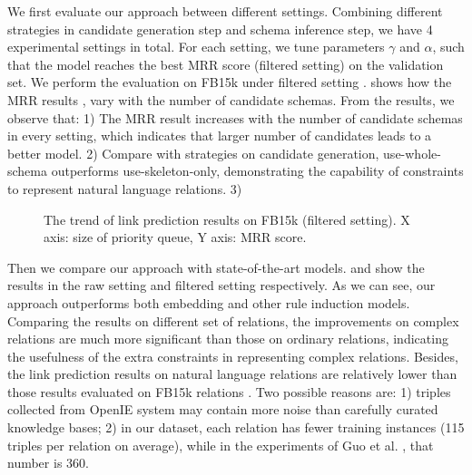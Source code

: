 We first evaluate our approach between different settings.
Combining different strategies in candidate generation step and 
schema inference step, we have 4 experimental settings in total.
For each setting, we tune parameters $\gamma$ and $\alpha$, such that
the model reaches the best MRR score (filtered setting) on the validation set.
We perform the evaluation on FB15k under filtered setting .
 shows how the MRR results 
, vary with the number of candidate schemas.
From the results, we observe that:
1) The MRR result increases with the number of candidate schemas in 
every setting, which indicates that larger number of candidates 
leads to a better model.
2) Compare with strategies on candidate generation, use-whole-schema 
outperforms use-skeleton-only, demonstrating the capability of constraints
to represent natural language relations.
3) 

\begin{figure}[th]
\centering
\caption{
	The trend of link prediction results on FB15k (filtered setting).
	X axis: size of priority queue,
	Y axis: MRR score. 
}
\label{fig:trend-with-budget}
\end{figure}

Then we compare our approach with state-of-the-art models.
 and  
show the results in
the raw setting and filtered setting respectively.
As we can see, our approach outperforms both embedding and 
other rule induction models.
Comparing the results on different set of relations,
the improvements on complex relations are much more significant than those
on ordinary relations, indicating the usefulness of the extra constraints 
in representing complex relations.
Besides, the link prediction results on natural language relations 
are relatively lower than
those results evaluated on FB15k relations \cite{guo2016jointly}.
Two possible reasons are: 1) triples collected from OpenIE system may 
contain more noise than carefully curated knowledge bases; 
2) in our dataset, each relation has fewer training instances 
(115 triples per relation on average), while in the experiments
of Guo et al. , that number is 360.

